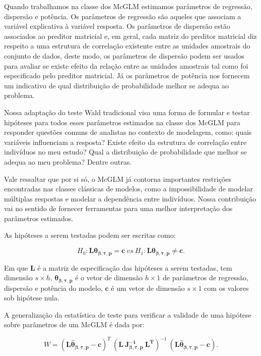 Quando trabalhamos na classe dos McGLM estimamos parâmetros de regressão, dispersão e potência. Os parâmetros de regressão são aqueles que associam a variável explicativa à variável resposta. Os parâmetros de dispersão estão associados ao preditor matricial e, em geral, cada matriz do preditor matricial diz respeito a uma estrutura de correlação existente entre as unidades amostrais do conjunto de dados, deste modo, os parâmetros de dispersão podem ser usados para avaliar se existe efeito da relação entre as unidades amostrais tal como foi especificado pelo preditor matricial. Já os parâmetros de potência nos fornecem um indicativo de qual distribuição de probabilidade melhor se adequa ao problema. 

Nossa adaptação do teste Wald tradicional visa uma forma de formular e testar hipóteses para todos esses parâmetros estimados na classe dos McGLM para responder questões comuns de analistas no contexto de modelagem, como: quais variáveis influenciam a resposta? Existe efeito da estrutura de correlação entre indivíduos no meu estudo? Qual a distribuição de probabilidade que melhor se adequa ao meu problema? Dentre outras.

Vale ressaltar que por si só, o McGLM já contorna importantes restrições encontradas nas classes clássicas de modelos, como a impossibilidade de modelar múltiplas respostas e modelar a dependência entre indivíduos. Nossa contribuição vai no sentido de fornecer ferramentas para uma melhor interpretação dos parâmetros estimados.

As hipóteses a serem testadas podem ser escritas como:

\begin{equation}
H_0: \boldsymbol{L}\boldsymbol{\theta_{\beta,\tau,p}} = \boldsymbol{c} \ vs \ H_1: \boldsymbol{L}\boldsymbol{\theta_{\beta,\tau,p}} \neq \boldsymbol{c}. 
\end{equation}

\noindent Em que $\boldsymbol{L}$ é a matriz de especificação das hipóteses a serem testadas, tem dimensão $s \times h$, $\boldsymbol{\theta_{\beta,\tau,p}}$ é o vetor de dimensão $h \times 1$ de parâmetros de regressão, dispersão e potência do modelo, $\boldsymbol{c}$ é um vetor de dimensão $s \times 1$ com os valores sob hipótese nula.

A generalização da estatística de teste para verificar a validade de uma hipótese sobre parâmetros de um McGLM é dada por:

\begin{equation}
W = (\boldsymbol{L\hat\theta_{\beta,\tau,p}} - \boldsymbol{c})^T \ (\boldsymbol{L \ J_{\boldsymbol{{\beta,\tau,p}}}^{-1} \ L^T})^{-1} \ (\boldsymbol{L\hat\theta_{\beta,\tau,p}} - \boldsymbol{c}).
\end{equation}


